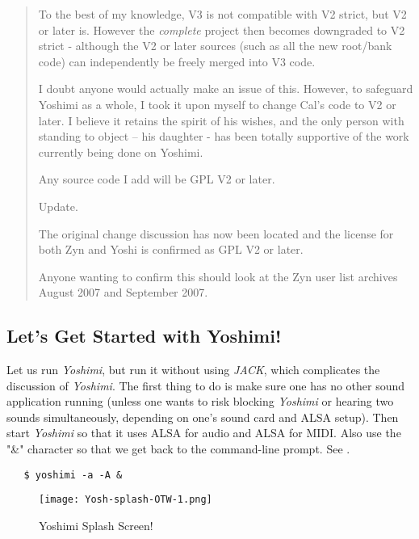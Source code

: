 \documentclass[
 11pt,
 twoside,
 a4paper,
 headinclude,
 footinclude,
 final                                 %
]{article}
\begin{document}
\begin{quotation}
      To the best of my knowledge, V3 is not compatible with V2 strict, but V2
      or later is. However the \textsl{complete}
      project then becomes downgraded to V2
      strict - although the V2 or later sources (such as all the new root/bank
      code) can independently be freely merged into V3 code.

      I doubt anyone would actually make an issue of this. However, to safeguard
      Yoshimi as a whole, I took it upon myself to change Cal's code to V2 or
      later. I believe it retains the spirit of his wishes, and the only person
      with standing to object -- his daughter - has been totally supportive of
      the work currently being done on Yoshimi.

      Any source code I add will be GPL V2 or later.

      Update.

      The original change discussion has now been located and the license for
      both Zyn and Yoshi is confirmed as GPL V2 or later.

      Anyone wanting to confirm this should look at the Zyn user list archives
      August 2007 and September 2007.
   \end{quotation}

\subsection{Let's Get Started with Yoshimi!}
\label{subsec:introduction_lets_get_started}

   Let us run \textsl{Yoshimi}, but run it without using \textsl{JACK}, which
   complicates the discussion of \textsl{Yoshimi}.  The first
   thing to do is make sure one has no other sound application running
   (unless one wants to risk blocking \textsl{Yoshimi} or hearing two sounds
   simultaneously, depending on one's sound card and ALSA setup).
   Then start \textsl{Yoshimi} so that it uses ALSA for audio and ALSA for
   MIDI.  Also use the "\&" character so that we get back to the
   command-line prompt.
   See .

\begin{verbatim}
   $ yoshimi -a -A &
\end{verbatim}

\begin{figure}[H]
   \centering 
   \texttt{[image: Yosh-splash-OTW-1.png]}
   \caption{Yoshimi Splash Screen!}
   \label{fig:yoshimi_splash_screen}
\end{figure}
\end{document}
